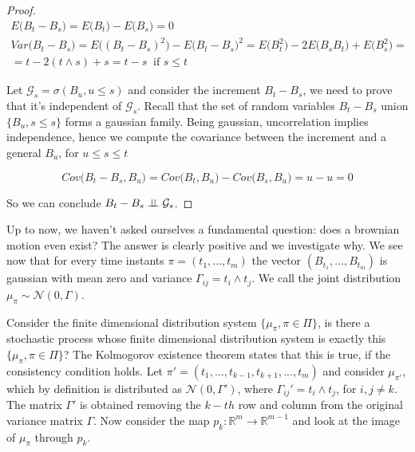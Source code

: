 \begin{proof}
    \begin{gather*}
        E\big(B_t-B_s\big) = E\big( B_t \big) - E\big( B_s \big) = 0 \\
        Var\big( B_t - B_s \big) = E\big( (B_t-B_s)^2 \big) - E\big(B_t-B_s\big)^2 = E\big( B_t^2) -2 E\big( B_s B_t \big) + E \big( B_s^2 \big) = \\
        = t-2( t \wedge s )+s = t-s \;\; \text{if $s \leq t$}
    \end{gather*}

    Let $\mathcal{G}_s = \sigma(B_u, u\leq s)$ and consider the increment $B_t - B_s$, we need to prove that it's independent of $\mathcal{G}_s$. Recall that the set of random variables $B_t-B_s$ union $\{ B_u, s \leq s\}$ forms a gaussian family. Being gaussian, uncorrelation implies independence, hence we compute the covariance between the increment and a general $B_u$, for $u \leq s \leq t$

    \begin{equation*}
        Cov\big(B_t - B_s, B_u\big) = Cov\big(B_t,B_u\big) - Cov\big(B_s,B_u\big) = u - u = 0
    \end{equation*}

    So we can conclude $B_t-B_s \perp \!\!\! \perp \mathcal{G}_s$.
\end{proof}

Up to now, we haven't asked ourselves a fundamental question: does a brownian motion even exist? The answer is clearly positive and we investigate why. We see now that for every time instants $\pi = (t_1,...,t_m)$ the vector $(B_{t_1},...,B_{t_m})$ is gaussian with mean zero and variance $\Gamma_{ij} = t_i \wedge t_j$. We call the joint distribution $\mu_{\pi} \sim \mathcal{N}(0,\Gamma)$. 

Consider the finite dimensional distribution system $\{ \mu_{\pi}, \pi \in \Pi \}$, is there a stochastic process whose finite dimensional distribution system is exactly this $\{ \mu_{\pi}, \pi \in \Pi \}$? The Kolmogorov existence theorem states that this is true, if the consistency condition holds. Let $\pi' = (t_1,...,t_{k-1},t_{k+1},...,t_m)$ and consider $\mu_{\pi'}$, which by definition is distributed as $\mathcal{N}(0,\Gamma')$, where $\Gamma_{ij}' = t_i \wedge t_j$, for $i,j \neq k$. The matrix $\Gamma'$ is obtained removing the $k-th$ row and column from the original variance matrix $\Gamma$. Now consider the map $p_k : \mathbb{R}^{m} \to \mathbb{R}^{m-1}$ and look at the image of $\mu_{\pi}$ through $p_k$. 

